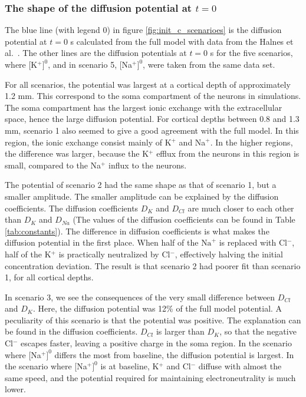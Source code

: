 \documentclass{article}
\begin{document}
\subsubsection{The shape of the diffusion potential at $t=0$}

The blue line (with legend 0) in figure \ref{fig:init_c_scenarioes} is the diffusion potential at $t=0$ s calculated from the full model with data from the Halnes et al.~\cite{Halnes2016}. The other lines are the diffusion potentials at $t=0$ s for the five scenarios, where [K$^+]^0$, and in scenario 5, [Na$^+]^0$, were taken from the same data set.  

For all scenarios, the potential was largest at a cortical depth of approximately 1.2 mm. This correspond to the soma compartment of the neurons in simulations. The soma compartment has the largest ionic exchange with the extracellular space, hence the large diffusion potential. For cortical depths between 0.8 and 1.3 mm, scenario 1 also seemed to give a good agreement with the full model. In this region, the ionic exchange consist mainly of K$^+$ and Na$^+$. In the higher regions, the difference was larger, because the K$^+$ efflux from the neurons in this region is small, compared to the Na$^+$ influx to the neurons.

The potential of scenario 2 had the same shape as that of scenario 1, but a smaller amplitude. The smaller amplitude can be explained by the diffusion coefficients. The diffusion coefficients $D_K$ and $D_{Cl}$ are much closer to each other than $D_K$ and $D_{Na}$ (The values of the diffusion coefficients can be found in Table \ref{tab:constants}).  The difference in diffusion coefficients is what makes the diffusion potential in the first place. When half of the $\text{Na}^+ $ is replaced with Cl$^-$, half of the K$^+$ is practically neutralized by Cl$^-$, effectively halving the initial concentration deviation. The result is that scenario 2 had poorer fit than scenario 1, for all cortical depths. 

In scenario 3, we see the consequences of the very small difference between $D_{Cl}$ and $D_K$. Here, the diffusion potential was 12\% of the full model potential. A peculiarity of this scenario is that the potential was positive. The explanation can be found in the diffusion coefficients. $D_{Cl}$ is larger than $D_K$, so that the negative Cl$^-$ escapes faster, leaving a positive charge in the soma region. In the scenario where [Na$^+]^0$ differs the most from baseline, the diffusion potential is largest. In the scenario where [Na$^+]^0$ is at baseline, K$^+$ and Cl$^-$ diffuse with almost the same speed, and the potential required for maintaining electroneutrality is much lower. 
\end{document}
